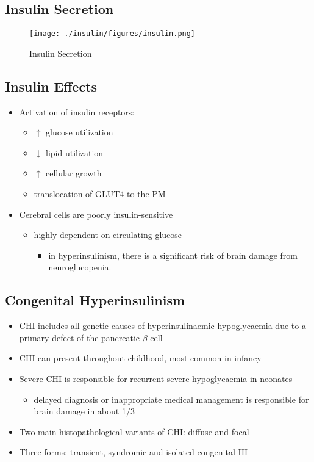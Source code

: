 \documentclass{scrartcl}
\begin{document}
\subsection{Insulin Secretion}
\label{sec:orgc1c9ed2}

\begin{figure}[htbp]
\centering
\texttt{[image: ./insulin/figures/insulin.png]}
\caption[insulin]{\label{fig:org8d16d18}
Insulin Secretion}
\end{figure}

\subsection{Insulin Effects}
\label{sec:org85cda24}
\begin{itemize}
\item Activation of insulin receptors:
\begin{itemize}
\item \(\uparrow\) glucose utilization
\item \(\downarrow\) lipid utilization
\item \(\uparrow\) cellular growth
\item translocation of GLUT4 to the PM
\end{itemize}
\item Cerebral cells are poorly insulin-sensitive
\begin{itemize}
\item highly dependent on circulating glucose
\begin{itemize}
\item in hyperinsulinism, there is a significant risk of brain damage
from neuroglucopenia.
\end{itemize}
\end{itemize}
\end{itemize}

\subsection{Congenital Hyperinsulinism}
\label{sec:org82add7b}
\begin{itemize}
\item CHI includes all genetic causes of hyperinsulinaemic
hypoglycaemia due to a primary defect of the pancreatic
\(\beta\)-cell
\item CHI can present throughout childhood, most common in infancy
\item Severe CHI is responsible for recurrent severe hypoglycaemia in neonates
\begin{itemize}
\item delayed diagnosis or inappropriate medical management is responsible for brain damage in about 1/3
\end{itemize}
\item Two main histopathological variants of CHI: diffuse and focal
\item Three forms: transient, syndromic and isolated congenital HI
\end{itemize}
\end{document}

